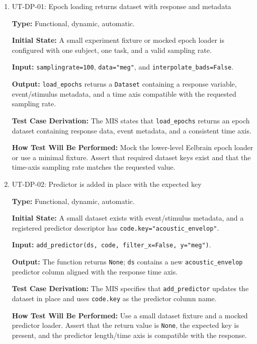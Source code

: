 \documentclass[12pt, titlepage]{article}
\begin{document}
\begin{enumerate}

\item{UT-DP-01: Epoch loading returns dataset with response and metadata\\}

\textbf{Type:} Functional, dynamic, automatic.

\textbf{Initial State:} A small experiment fixture or mocked epoch loader is configured with one subject, one task, and a valid sampling rate.

\textbf{Input:} \texttt{samplingrate=100}, \texttt{data="meg"}, and \texttt{interpolate\_bads=False}.

\textbf{Output:} \texttt{load\_epochs} returns a \texttt{Dataset} containing a response variable, event/stimulus metadata, and a time axis compatible with the requested sampling rate.

\textbf{Test Case Derivation:} The MIS states that \texttt{load\_epochs} returns an epoch dataset containing response data, event metadata, and a consistent time axis.

\textbf{How Test Will Be Performed:} Mock the lower-level Eelbrain epoch loader or use a minimal fixture. Assert that required dataset keys exist and that the time-axis sampling rate matches the requested value.

\item{UT-DP-02: Predictor is added in place with the expected key\\}

\textbf{Type:} Functional, dynamic, automatic.

\textbf{Initial State:} A small dataset exists with event/stimulus metadata, and a registered predictor descriptor has \texttt{code.key="acoustic\_envelop"}.

\textbf{Input:} \texttt{add\_predictor(ds, code, filter\_x=False, y="meg")}.

\textbf{Output:} The function returns \texttt{None}; \texttt{ds} contains a new \texttt{acoustic\_envelop} predictor column aligned with the response time axis.

\textbf{Test Case Derivation:} The MIS specifies that \texttt{add\_predictor} updates the dataset in place and uses \texttt{code.key} as the predictor column name.

\textbf{How Test Will Be Performed:} Use a small dataset fixture and a mocked predictor loader. Assert that the return value is \texttt{None}, the expected key is present, and the predictor length/time axis is compatible with the response.


\end{enumerate}
\end{document}
